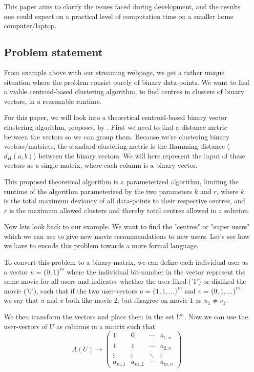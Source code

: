 \documentclass[a4paper]{article}
\begin{document}
This paper aims to clarify the issues faced during development, and the results one could expect
on a practical level of computation time on a smaller home computer/laptop.

\subsection{Problem statement}
From example above with our streaming webpage, we get a rather unique situation where the problem consist
purely of binary data-points. We want to find a viable centroid-based clustering algorithm, to find
centres in clusters of binary vectors, in a reasonable runtime.

For this paper, we will look into a theoretical centroid-based binary vector clustering algorithm, proposed
by \cite{fomin_golovach_panolan_2020}. First we need to find a distance metric between the vectors so we
can group them. Because we're clustering binary vectors/matrices, the standard clustering metric is
the Hamming distance (\textit{$d_H(a, b)$}) between the binary vectors. We will here represent the input of these
vectors as a single matrix, where each column is a binary vector.

This proposed theoretical algorithm is a parameterized algorithm, limiting the runtime of the
algorithm parameterized by the two parameters $k$ and $r$, where $k$ is the total maximum deviancy
of all data-points to their respective centres, and $r$ is the maximum allowed clusters and
thereby total centres allowed in a solution.

Now lets look back to our example. We want to find the "centres" or "super users" which we can use to
give new movie recommendations to new users. Let's see how we have to encode this problem towards
a more formal language.

To convert this problem to a binary matrix, we can define each individual user as a vector
$u=\{0,1\}^m$ where the individual bit-number in the vector represent the same movie for all users
and indicates whether the user liked ('1') or disliked the movie ('0'), such that if the two
user-vectors $u=\{1,1,\ldots\}^m$ and $v=\{0,1,\ldots\}^m$ we say that $u$ and $v$ both like movie $2$,
but disagree on movie $1$ as $u_1 \neq v_1$.

We then transform the vectors and place them in the set $U^n$. Now we can use the user-vectors of $U$
as columns in a matrix such that
\[
    A(U)  \rightarrow \begin{pmatrix}
        1       & 0       & \cdots & a_{1,n} \\
        1       & 1       & \cdots & a_{2,n} \\
        \vdots  & \vdots  & \ddots & \vdots  \\
        a_{m,1} & a_{m,2} & \cdots & a_{m,n}
    \end{pmatrix}
\]
\end{document}
